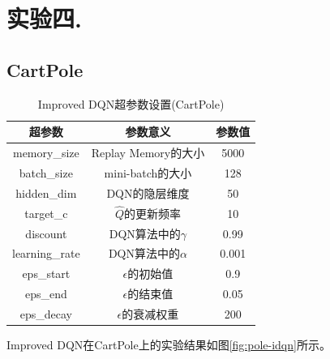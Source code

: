 \documentclass[a4paper,UTF8]{article}
\theoremstyle{definition}
\begin{document}
\section*{实验四.}

\subsection*{CartPole}

\begin{table}[H]
	\centering
	\begin{tabular}{ccc}
		\toprule
		超参数 & 参数意义 & 参数值 \\
		\midrule
		memory\_size & Replay Memory的大小 & 5000 \\
		batch\_size & mini-batch的大小 & 128 \\
		hidden\_dim & DQN的隐层维度 & 50 \\
		target\_c & $\hat{Q}$的更新频率 & 10 \\
		discount & DQN算法中的$\gamma$ & 0.99 \\
		learning\_rate & DQN算法中的$\alpha$ & 0.001 \\
		eps\_start & $\epsilon$的初始值 & 0.9 \\
		eps\_end & $\epsilon$的结束值 & 0.05 \\
		eps\_decay & $\epsilon$的衰减权重 & 200 \\
		\bottomrule
	\end{tabular}
	\caption{Improved DQN超参数设置(CartPole)}\label{tab:pole-idqn}
\end{table}

Improved DQN在CartPole上的实验结果如图\ref{fig:pole-idqn}所示。
\end{document}
